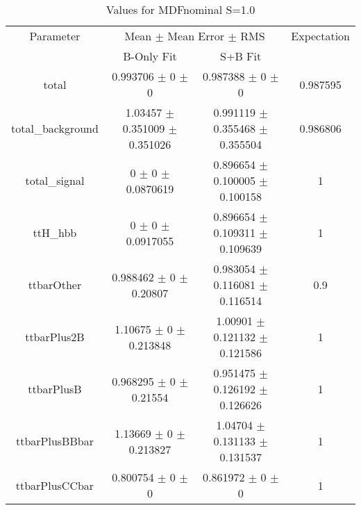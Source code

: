 \begin{table}
\centering
\caption{Values for MDFnominal S=1.0}
\begin{tabular}{cccc}
\toprule
Parameter & \multicolumn{2}{c}{Mean $\pm$ Mean Error $\pm$ RMS} & Expectation\\
 & B-Only Fit & S+B Fit & \\
\midrule
total & \num{0.993706} $\pm$ \num{0} $\pm$ \num{0} & \num{0.987388} $\pm$ \num{0} $\pm$ \num{0} & \num{0.987595}\\
total\_background & \num{1.03457} $\pm$ \num{0.351009} $\pm$ \num{0.351026} & \num{0.991119} $\pm$ \num{0.355468} $\pm$ \num{0.355504} & \num{0.986806}\\
total\_signal & \num{0} $\pm$ \num{0} $\pm$ \num{0.0870619} & \num{0.896654} $\pm$ \num{0.100005} $\pm$ \num{0.100158} & \num{1}\\
ttH\_hbb & \num{0} $\pm$ \num{0} $\pm$ \num{0.0917055} & \num{0.896654} $\pm$ \num{0.109311} $\pm$ \num{0.109639} & \num{1}\\
ttbarOther & \num{0.988462} $\pm$ \num{0} $\pm$ \num{0.20807} & \num{0.983054} $\pm$ \num{0.116081} $\pm$ \num{0.116514} & \num{0.9}\\
ttbarPlus2B & \num{1.10675} $\pm$ \num{0} $\pm$ \num{0.213848} & \num{1.00901} $\pm$ \num{0.121132} $\pm$ \num{0.121586} & \num{1}\\
ttbarPlusB & \num{0.968295} $\pm$ \num{0} $\pm$ \num{0.21554} & \num{0.951475} $\pm$ \num{0.126192} $\pm$ \num{0.126626} & \num{1}\\
ttbarPlusBBbar & \num{1.13669} $\pm$ \num{0} $\pm$ \num{0.213827} & \num{1.04704} $\pm$ \num{0.131133} $\pm$ \num{0.131537} & \num{1}\\
ttbarPlusCCbar & \num{0.800754} $\pm$ \num{0} $\pm$ \num{0} & \num{0.861972} $\pm$ \num{0} $\pm$ \num{0} & \num{1}\\
\bottomrule
\end{tabular}
\end{table}